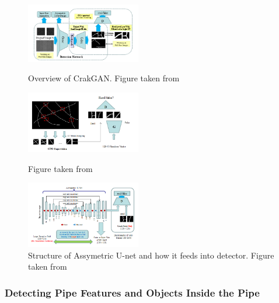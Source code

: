 \documentclass[11pt]{article}		%
\begin{document}
        	\begin{figure}[h]
				\centering
				\begin{multicols}{3}
					\includegraphics[width=5cm]{CrackGan_Overview.png}
					\caption{Overview of CrakGAN. Figure taken from \cite{CrackGAN}}
					\label{crackGAN_Overview}
					\columnbreak
					\includegraphics[width=5cm]{Generative_CPO_CrackGan.png}
					\caption{Figure taken from \cite{CrackGAN1}}
					\label{Generative_CPO_CrackGan}
					
					\columnbreak
					
					\includegraphics[width=5cm]{assymmetric_unet.PNG}
					\caption{Structure of Assymetric U-net and how it feeds into detector. Figure taken from \cite{CrackGAN1}}
					\label{assymmetric_unet}
				\end{multicols}
			\end{figure}	
				
		\subsubsection{Detecting Pipe Features and Objects Inside the Pipe}
		
\end{document}
